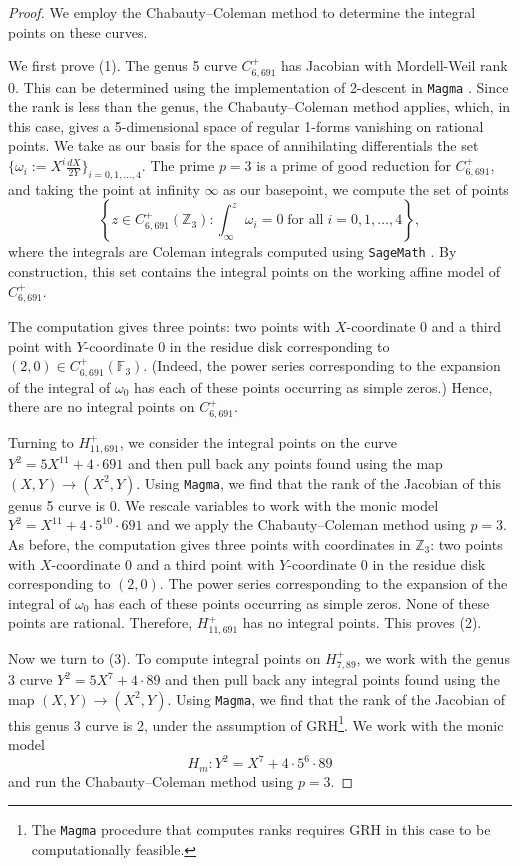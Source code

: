 \documentclass[12pt]{amsart}
\newcommand{\Z}{\mathbb{Z}}
\newcommand{\F}{\mathbb{F}}
\newcommand{\?}{\color{red}?}
\numberwithin{equation}{section}
\begin{document}
\begin{proof}
We employ the Chabauty--Coleman method \cite{coleman} to determine the integral points on these curves. 

We first prove (1). The genus 5 curve $C^{+}_{6,691}$ has Jacobian with Mordell-Weil rank 0. This can be determined using the implementation of 2-descent in \texttt{Magma} \cite{magma}. Since the rank is less than the genus,  the Chabauty--Coleman method applies, which, in this case, gives a 5-dimensional space of regular 1-forms vanishing on rational points. We take as our basis for the space of annihilating differentials the set $\{\omega_i := X^i \frac{dX}{2Y}\}_{i = 0, 1, \ldots, 4}.$ The prime $p = 3$ is a prime of good reduction for $C^{+}_{6,691}$, and taking the point at infinity $\infty$ as our basepoint, we compute the set of points $$\left\{z \in C^{+}_{6,691}(\Z_3): \int_{\infty}^z \omega_i = 0\;\textrm{for all}\;{i = 0, 1, \ldots, 4}\right\},$$ where the integrals are Coleman integrals computed using \texttt{SageMath} \cite{sage}. By construction,  this set contains the integral points on the working affine model of $C^{+}_{6,691}$. 

The computation gives three points: two points with $X$-coordinate 0 and a third point with $Y$-coordinate 0 in the residue disk corresponding to $(2,0) \in C^{+}_{6,691}(\F_3)$. (Indeed, the power series corresponding to the expansion of the integral of $\omega_0$ has each of these points occurring as simple zeros.)  Hence, there are no integral points on $C^{+}_{6,691}$.

Turning to $H^{+}_{11,691}$, we consider the integral points on the curve $Y^2 = 5X^{11} + 4 \cdot 691$ and then pull back any points found using the map $(X,Y) \rightarrow (X^2,Y)$. Using \texttt{Magma}, we find that the rank of the Jacobian of this genus 5 curve is 0. We rescale variables to work with the monic model $Y^2 = X^{11}+4\cdot 5^{10}\cdot 691$ and we apply the Chabauty--Coleman method using $p = 3$. As before, the computation gives three points with coordinates in $\Z_3$: two points with $X$-coordinate 0 and a third point with $Y$-coordinate 0 in the residue disk corresponding to $(2,0)$. The power series corresponding to the expansion of the integral of $\omega_0$ has each of these points occurring as simple zeros. None of these points are rational. Therefore, $H^{+}_{11,691}$ has no integral points. This proves (2).

Now we turn to (3). To compute integral points on $H^{+}_{7,89}$, we work with the genus 3 curve $Y^2 = 5X^{7} + 4 \cdot 89$ and then pull back any integral points found using the map $(X,Y) \rightarrow (X^2,Y)$. Using \texttt{Magma}, we find that the rank of the Jacobian of this genus 3 curve is 2, under the assumption of GRH\footnote{The \texttt{Magma} procedure that computes ranks requires GRH in this case to be computationally feasible.}. We work with the monic model $$H_m: Y^2 = X^{7}+4\cdot 5^{6}\cdot 89$$ and run the Chabauty--Coleman method using $p = 3$. 



\end{proof}
\end{document}
